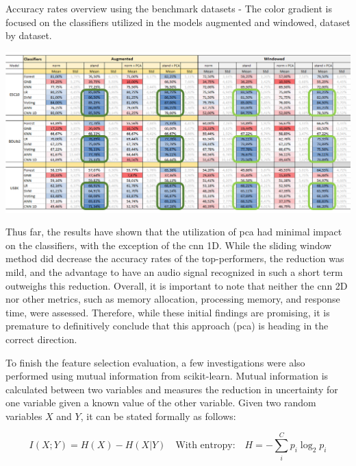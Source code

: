 \begin{table}[ht!]
    \caption[Accuracy rates overview using the benchmark datasets - Models augmented x windowed (Focus on the classifiers dataset by dataset)]{Accuracy rates overview using the benchmark datasets - The color gradient is focused on the classifiers utilized in the models augmented and windowed, dataset by dataset.}
    \label{table:results_accuracy_overview_features_windowed}
     \raggedright
    \includegraphics[width=1\textwidth]{resources/images/060-results/Results_classification_overview_aug_x_ori_3.png}
\end{table}

Thus far, the results have shown that the utilization of \gls{pca} had minimal impact on the classifiers, with the exception of the \gls{cnn} 1D. While the sliding window method did decrease the accuracy rates of the top-performers, the reduction was mild, and the advantage to have an audio signal recognized in such a short term outweighs this reduction. Overall, it is important to note that neither the \gls{cnn} 2D nor other metrics, such as memory allocation, processing memory, and response time, were assessed. Therefore, while these initial findings are promising, it is premature to definitively conclude that this approach (\gls{pca}) is heading in the correct direction.

To finish the feature selection evaluation, a few investigations were also performed using mutual information from scikit-learn. Mutual information is calculated between two variables and measures the reduction in uncertainty for one variable given a known value of the other variable. Given two random variables $X$ and $Y$, it can be stated formally as follows:

\begin{equation}
    \label{eq:results_} 
    I(X ; Y) = H(X) - H(X | Y) \quad \text{With entropy:} \quad H = - \sum_i^C p_i \log_2p_i
\end{equation}

